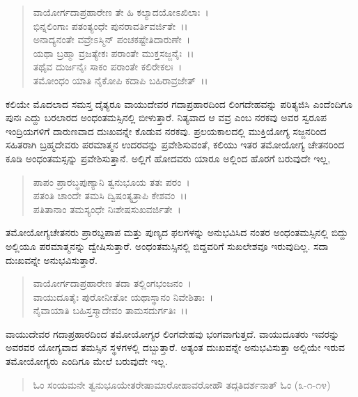\begin{verse}
ವಾಯೋರ್ಗದಾಪ್ರಹಾರೇಣ ತೇ ಹಿ ಕಲ್ಯಾದಯೋಽಖಿಲಾಃ~।\\ ಭಿನ್ನಲಿಂಗಾಃ ಪತಂತ್ಯಂಧೇ ಪುನರಾವರ್ತಿವರ್ಜಿತೇ~।।\\ ಅನಾದ್ಯನಂತೇ ವವ್ರೇಽಸ್ಮಿನ್ ಪಂಚಕಷ್ಟೇತಿದಾರುಣೇ~।\\ ಯಥಾ ಬ್ರಹ್ಮಾ ವ್ರಜತ್ಯೇಕಃ ಪರಾಂತೇ ಮುಕ್ತಸಜ್ಜನೈಃ~।।\\ ತಥೈವ ದುರ್ಜನೈಃ ಸಾಕಂ ಪರಾಂತೇ ಕಲಿರೇಕಲಃ~।\\ ತಮೋಂಧಂ ಯಾತಿ ನೈಕೋಪಿ ಕದಾಪಿ ಬಹಿರಾವ್ರಜೇತ್~।।
\end{verse}


ಕಲಿಯೇ ಮೊದಲಾದ ಸಮಸ್ತ ದೈತ್ಯರೂ ವಾಯುದೇವರ ಗದಾಪ್ರಹಾರದಿಂದ ಲಿಂಗದೇಹವನ್ನು ಪರಿತ್ಯಜಿಸಿ ಎಂದೆಂದಿಗೂ ಪುನಃ ಎದ್ದು ಬರಲಾರದ ಅಂಧಂತಮಸ್ಸಿನಲ್ಲಿ ಬೀಳುತ್ತಾರೆ. ನಿತ್ಯವಾದ ಆ ವವ್ರ ಎಂಬ ನರಕವು ಅವರ ಸ್ವರೂಪ ಇಂದ್ರಿಯಗಳಿಗೆ ದಾರುಣವಾದ ದುಃಖವನ್ನೇ ಕೊಡುವ ನರಕವು. ಪ್ರಲಯಕಾಲದಲ್ಲಿ ಮುಕ್ತಿಯೋಗ್ಯ ಸಜ್ಜನರಿಂದ ಸಹಿತರಾಗಿ ಬ್ರಹ್ಮದೇವರು ಪರಮಾತ್ಮನ ಉದರವನ್ನು ಪ್ರವೇಶಿಸುವಂತೆ, ಕಲಿಯು ಇತರ ತಮೋಯೋಗ್ಯ ಚೇತನರಿಂದ ಕೂಡಿ ಅಂಧಂತಮಸ್ಸನ್ನು ಪ್ರವೇಶಿಸುತ್ತಾನೆ. ಅಲ್ಲಿಗೆ ಹೋದವರು ಯಾರೂ ಅಲ್ಲಿಂದ ಹೊರಗೆ ಬರುವುದೇ ಇಲ್ಲ,

\begin{verse}
ಪಾಪಂ ಪ್ರಾರಬ್ಧಪುಣ್ಯಾನಿ ತ್ವನುಭೂಯ ತತಃ ಪರಂ~।\\ ಪತಂತಿ ಚಾಂದೇ ತಮಸಿ ದ್ವಿಷಂತ್ಯತ್ರಾಪಿ ಕೇಶವಂ~।।\\ ಪತಿತಾನಾಂ ತಮಸ್ಯಂಧೇ ನಿಃಶೇಷಸುಖವರ್ಜಿತೇ~।
\end{verse}


ತಮೋಯೋಗ್ಯಚೇತನರು ಪ್ರಾರಬ್ದಪಾಪ ಮತ್ತು ಪುಣ್ಯದ ಫಲಗಳನ್ನು ಅನುಭವಿಸಿದ ನಂತರ ಅಂಧಂತಮಸ್ಸಿನಲ್ಲಿ ಬಿದ್ದು ಅಲ್ಲಿಯೂ ಪರಮಾತ್ಮನನ್ನು ದ್ವೇಷಿಸುತ್ತಾರೆ. ಅಂಧಂತಮಸ್ಸಿನಲ್ಲಿ ಬಿದ್ದವರಿಗೆ ಸುಖಲೇಶವೂ ಇರುವುದಿಲ್ಲ. ಸದಾ ದುಃಖವನ್ನೇ ಅನುಭವಿಸುತ್ತಾರೆ.

\begin{verse}
ವಾಯೋರ್ಗದಾಪ್ರಹಾರೇಣ ತದಾ ತಲ್ಲಿಂಗಭಂಜನಂ~।\\ ವಾಯುದೂತೈಃ ಪುರೋನೀತೋ ಯಥಾಸ್ಥಾನಂ ನಿವೇಶಿತಾಃ~।\\ ನೈವಾಯಾತಿ ಬಹಿಸ್ತಸ್ಮಾದೇವಂ ತಾಮಸದುರ್ಗತಿಃ~।।
\end{verse}


ವಾಯುದೇವರ ಗದಾಪ್ರಹಾರದಿಂದ ತಮೋಯೋಗ್ಯರ ಲಿಂಗದೇಹವು ಭಂಗವಾಗುತ್ತದೆ. ವಾಯುದೂತರು ಇವರನ್ನು ಅವರವರ ಯೋಗ್ಯವಾದ ತಮಸ್ಸಿನ ಸ್ಥಳಗಳಲ್ಲಿ ದಬ್ಬುತ್ತಾರೆ. ಅತ್ಯಂತ ದುಃಖವನ್ನೇ ಅನುಭವಿಸುತ್ತಾ ಅಲ್ಲಿಯೇ ಇರುವ ತಮೋಯೋಗ್ಯರು ಎಂದಿಗೂ ಮೇಲೆ ಬರುವುದೇ ಇಲ್ಲ.

\begin{verse}
ಓಂ ಸಂಯಮನೇ ತ್ವನುಭೂಯೇತರೇಷಾಮಾರೋಹಾವರೋಹೌ ತದ್ಗತಿದರ್ಶನಾತ್ ಓಂ (೩-೧-೧೪)
\end{verse}

